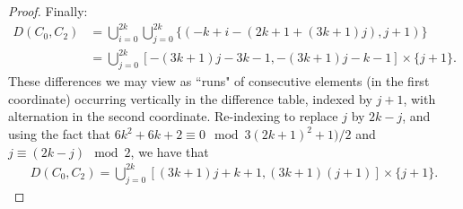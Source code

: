 \documentclass[12pt, a4paper]{article}
\theoremstyle{definition}
\begin{document}
\begin{proof}
Finally:
\begin{align*}
D(C_0,C_2) &=\bigcup_{i=0}^{2k}\bigcup_{j=0}^{2k}\{(-k+i-(2k+1+(3k+1)j),j+1)\}\\
&=\bigcup_{j=0}^{2k}[-(3k+1)j-3k-1,-(3k+1)j-k-1]\times\{j+1\}.
\end{align*}
These differences we may view as ``runs" of consecutive elements (in the first coordinate) occurring vertically in the difference table, indexed by $j+1$, with alternation in the second coordinate. Re-indexing to replace $j$ by $2k-j$, and using the fact that $6k^2+6k+2 \equiv 0 \mod 3(2k + 1)^2 + 1)/2$ and $j \equiv (2k-j) \mod 2$, we have that
\begin{align*}
D(C_0,C_2)=\bigcup_{j=0}^{2k}[(3k+1)j+k+1,(3k+1)(j+1)]\times\{j+1\}.
\end{align*}


\end{proof}
\end{document}
